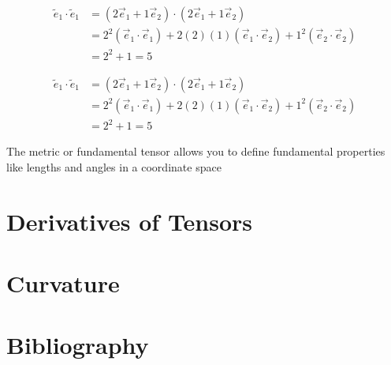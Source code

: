 \documentclass{book}
\begin{document}
\begin{align*}
  \tilde{e}_1\cdot\tilde{e}_1
  &=(2\vec{e}_1+1\vec{e}_2)\cdot(2\vec{e}_1+1\vec{e}_2)\\
  &=2^2(\vec{e}_1\cdot\vec{e}_1)+2(2)(1)(\vec{e}_1\cdot\vec{e}_2)+1^2(\vec{e}_2\cdot\vec{e}_2)\\
  &=2^2+1=5
\end{align*}

\begin{align*}
  \tilde{e}_1\cdot\tilde{e}_1
  &=(2\vec{e}_1+1\vec{e}_2)\cdot(2\vec{e}_1+1\vec{e}_2)\\
  &=2^2(\vec{e}_1\cdot\vec{e}_1)+2(2)(1)(\vec{e}_1\cdot\vec{e}_2)+1^2(\vec{e}_2\cdot\vec{e}_2)\\
  &=2^2+1=5
\end{align*}

The metric or fundamental tensor allows you to define fundamental properties like lengths and angles in a coordinate space



\chapter{Derivatives of Tensors}



\chapter{Curvature}



\chapter{Bibliography}

\end{document}
